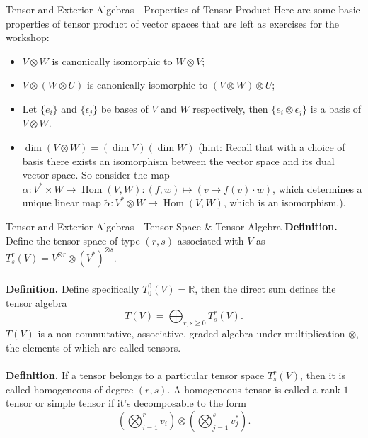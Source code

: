 \documentclass[aspectratio=169]{beamer}
\begin{document}
\begin{frame}{Tensor and Exterior Algebras - Properties of Tensor Product}
Here are some basic properties of tensor product of vector spaces that are left as exercises for the workshop:
\begin{itemize}
\item $V\otimes W$ is canonically isomorphic to $W\otimes V$;
\item $V\otimes(W\otimes U)$ is canonically isomorphic to $(V\otimes W)\otimes U$;
\item Let $\{e_i\}$ and $\{\epsilon_j\}$ be bases of $V$ and $W$ respectively, then $\{e_i\otimes\epsilon_j\}$ is a basis of $V\otimes W$.
\item $\dim(V\otimes W)=(\dim V)(\dim W)$ (hint: Recall that with a choice of basis there exists an isomorphism between the vector space and its dual vector space. So consider the map $\alpha:V^*\times W\to\operatorname{Hom}(V,W):(f,w)\mapsto(v\mapsto f(v)\cdot w)$, which determines a unique linear map $\tilde{\alpha}:V^*\otimes W\to\operatorname{Hom}(V,W)$, which is an isomorphism.).
\end{itemize}
\end{frame}
\begin{frame}{Tensor and Exterior Algebras - Tensor Space \& Tensor Algebra}
\textbf{Definition.} Define the \alert{tensor space} of type $(r,s)$ associated with $V$ as $T^r_s(V)=V^{\otimes r}\otimes (V^*)^{\otimes s}$.
\\~\\
\textbf{Definition.} Define specifically $T^0_0(V)=\mathbb{R}$, then the direct sum defines the \alert{tensor algebra} $$T(V)=\bigoplus_{r,s\geq0}T^r_s(V).$$ $T(V)$ is a non-commutative, associative, graded algebra under multiplication $\otimes$, the elements of which are called \alert{tensors}.
\\~\\
\textbf{Definition.} If a tensor belongs to a particular tensor space $T^r_s(V)$, then it is called \alert{homogeneous of degree $(r,s)$}. A homogeneous tensor is called a rank-$1$ tensor or simple tensor if it's decomposable to the form $$\left(\bigotimes_{i=1}^rv_i\right)\otimes\left(\bigotimes_{j=1}^sv^*_j\right).$$
\end{frame}
\end{document}
